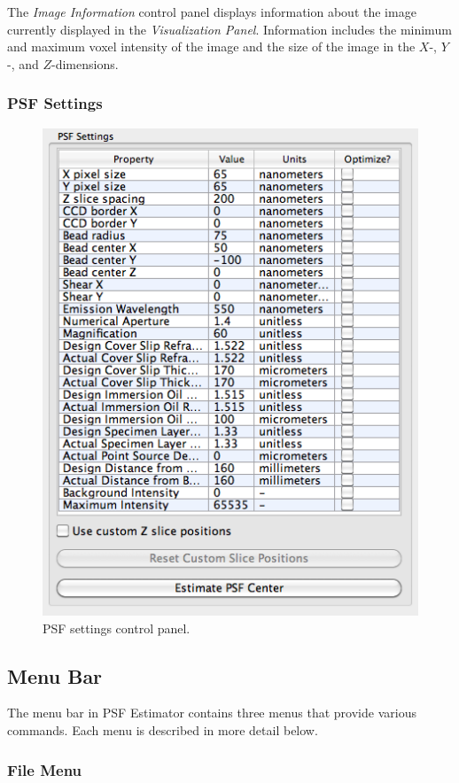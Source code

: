 \documentclass[11pt,titlepage,twoside]{article}
\begin{document}
The \emph{Image Information} control panel displays information about the image currently displayed in the \emph{Visualization Panel}. Information includes the minimum and maximum voxel intensity of the image and the size of the image in the $X$-, $Y$-, and $Z$-dimensions.

\subsubsection{PSF Settings}

\begin{figure}[h]
  \centering
  \includegraphics[scale=0.5]{images/PSFSettingsControlPanel}
  \caption{PSF settings control panel.}
  \label{fig:PSFSettingsControlPanel}
\end{figure}

\subsection{Menu Bar}

The menu bar in PSF Estimator contains three menus that provide various commands. Each menu is described in more detail below.

\subsubsection{File Menu}
\end{document}

